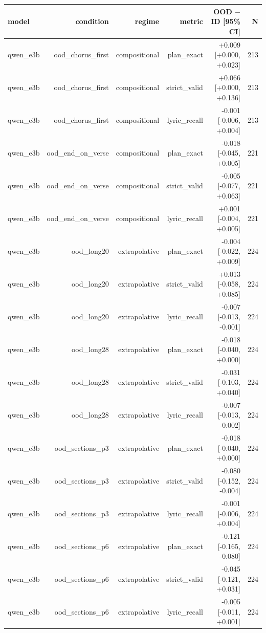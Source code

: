 \begin{table}[t]
\centering
\small
\begin{tabular}{lrrrrr}
\toprule
model & condition & regime & metric & OOD $-$ ID [95\% CI] & N \\
\midrule
qwen\_e3b & ood\_chorus\_first & compositional & plan\_exact & +0.009 [+0.000, +0.023] & 213 \\
qwen\_e3b & ood\_chorus\_first & compositional & strict\_valid & +0.066 [+0.000, +0.136] & 213 \\
qwen\_e3b & ood\_chorus\_first & compositional & lyric\_recall & -0.001 [-0.006, +0.004] & 213 \\
qwen\_e3b & ood\_end\_on\_verse & compositional & plan\_exact & -0.018 [-0.045, +0.005] & 221 \\
qwen\_e3b & ood\_end\_on\_verse & compositional & strict\_valid & -0.005 [-0.077, +0.063] & 221 \\
qwen\_e3b & ood\_end\_on\_verse & compositional & lyric\_recall & +0.001 [-0.004, +0.005] & 221 \\
qwen\_e3b & ood\_long20 & extrapolative & plan\_exact & -0.004 [-0.022, +0.009] & 224 \\
qwen\_e3b & ood\_long20 & extrapolative & strict\_valid & +0.013 [-0.058, +0.085] & 224 \\
qwen\_e3b & ood\_long20 & extrapolative & lyric\_recall & -0.007 [-0.013, -0.001] & 224 \\
qwen\_e3b & ood\_long28 & extrapolative & plan\_exact & -0.018 [-0.040, +0.000] & 224 \\
qwen\_e3b & ood\_long28 & extrapolative & strict\_valid & -0.031 [-0.103, +0.040] & 224 \\
qwen\_e3b & ood\_long28 & extrapolative & lyric\_recall & -0.007 [-0.013, -0.002] & 224 \\
qwen\_e3b & ood\_sections\_p3 & extrapolative & plan\_exact & -0.018 [-0.040, +0.000] & 224 \\
qwen\_e3b & ood\_sections\_p3 & extrapolative & strict\_valid & -0.080 [-0.152, -0.004] & 224 \\
qwen\_e3b & ood\_sections\_p3 & extrapolative & lyric\_recall & -0.001 [-0.006, +0.004] & 224 \\
qwen\_e3b & ood\_sections\_p6 & extrapolative & plan\_exact & -0.121 [-0.165, -0.080] & 224 \\
qwen\_e3b & ood\_sections\_p6 & extrapolative & strict\_valid & -0.045 [-0.121, +0.031] & 224 \\
qwen\_e3b & ood\_sections\_p6 & extrapolative & lyric\_recall & -0.005 [-0.011, +0.001] & 224 \\

\end{tabular}
\end{table}
